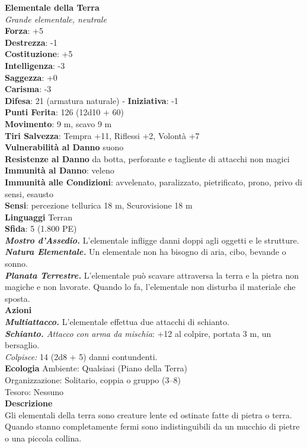 \begin{multicols}{2}
\medskip\textbf{Elementale della Terra}\\
\emph{Grande elementale, neutrale}\\
\textbf{Forza}: +5\\
\textbf{Destrezza}: -1\\
\textbf{Costituzione}: +5\\
\textbf{Intelligenza}: -3\\
\textbf{Saggezza}: +0\\
\textbf{Carisma}: -3\\
\textbf{Difesa}: 21 (armatura naturale) - \textbf{Iniziativa}: -1\\
\textbf{Punti Ferita}: 126 (12d10 + 60)\\
\textbf{Movimento}: 9 m, scavo 9 m\\
\textbf{Tiri Salvezza}: Tempra +11, Riflessi +2, Volontà +7\\
\textbf{Vulnerabilità al Danno} suono\\
\textbf{Resistenze al Danno} da botta, perforante e tagliente di attacchi non magici\\
\textbf{Immunità al Danno}: veleno\\
\textbf{Immunità alle Condizioni}: avvelenato, paralizzato, pietrificato, prono, privo di sensi, esausto\\
\textbf{Sensi}: percezione tellurica 18 m, Scurovisione 18 m\\
\textbf{Linguaggi} Terran\\
\textbf{Sfida}: 5 (1.800 PE)\smallskip\\
\emph{\textbf{Mostro d'Assedio.}} L'elementale infligge danni doppi agli oggetti e le strutture.\\
\emph{\textbf{Natura Elementale.}} Un elementale non ha bisogno di aria, cibo, bevande o sonno.\\
\emph{\textbf{Planata Terrestre.}} L'elementale può scavare attraversa la terra e la pietra non magiche e non lavorate. Quando lo fa, l'elementale non disturba il materiale che sposta.\\
\smallskip\textbf{Azioni}\\
\emph{\textbf{Multiattacco.}} L'elementale effettua due attacchi di schianto.\\
\emph{\textbf{Schianto.} Attacco con arma da mischia}: +12 al colpire, portata 3 m, un bersaglio.\\
\emph{Colpisce:} 14 (2d8 + 5) danni contundenti.\\
\textbf{Ecologia}
Ambiente: Qualsiasi (Piano della Terra)\\
Organizzazione: Solitario, coppia o gruppo (3–8)\\
Tesoro: Nessuno\\
\textbf{Descrizione}\\
Gli elementali della terra sono creature lente ed ostinate fatte di pietra o terra. Quando stanno completamente fermi sono indistinguibili da un mucchio di pietre o una piccola collina.\\


\end{multicols}
